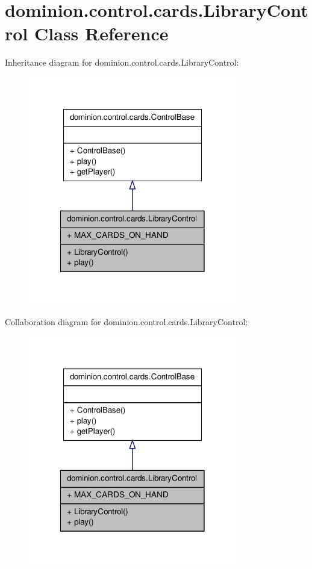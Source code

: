 \hypertarget{classdominion_1_1control_1_1cards_1_1LibraryControl}{\section{dominion.\-control.\-cards.\-Library\-Control \-Class \-Reference}
\label{classdominion_1_1control_1_1cards_1_1LibraryControl}
}


\-Inheritance diagram for dominion.\-control.\-cards.\-Library\-Control\-:
\nopagebreak
\begin{figure}[H]
\begin{center}
\leavevmode
\includegraphics[width=258pt]{classdominion_1_1control_1_1cards_1_1LibraryControl__inherit__graph}
\end{center}
\end{figure}


\-Collaboration diagram for dominion.\-control.\-cards.\-Library\-Control\-:
\nopagebreak
\begin{figure}[H]
\begin{center}
\leavevmode
\includegraphics[width=258pt]{classdominion_1_1control_1_1cards_1_1LibraryControl__coll__graph}
\end{center}
\end{figure}
